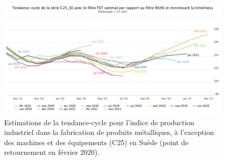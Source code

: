 \documentclass[
  11pt,
  french,
  a4paper]{article}
\newcommand\1{\mathds{1}}
\begin{document}
\begin{figure}[H]

{\centering \includegraphics[width=0.9\linewidth,]{img/simulations/c25_se_fst_rkhs_timeliness} 

}

\caption[Estimations de la tendance-cycle pour l'indice de production industriel dans la fabrication de produits métalliques, à l'exception des machines et des équipements (C25) en Suède (point de retournement en février 2020)]{Estimations de la tendance-cycle pour l'indice de production industriel dans la fabrication de produits métalliques, à l'exception des machines et des équipements (C25) en Suède (point de retournement en février 2020).}\label{fig:c25sep4}

\footnotesize
\normalsize\end{figure}

\newpage

\printbibliography[heading=bibintoc]
\end{document}
